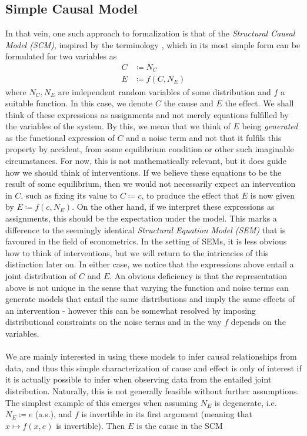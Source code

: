 \documentclass[11pt, a4paper]{memoir}
\theoremstyle{break}
\theoremstyle{break}
\theoremstyle{nonumberplain}
\begin{document}
\subsection{Simple Causal Model}
In that vein, one such approach to formalization is that of the \textit{Structural Causal Model (SCM)}, inspired by the terminology \cite{Peters}, which in its most simple form can be formulated for two variables as
\begin{align*}
C&\coloneqq N_C\\
E&\coloneqq f(C,N_E)
\end{align*}
where $N_C,N_E$ are independent random variables of some distribution and $f$ a suitable function. In this case, we denote $C$ the cause and $E$ the effect. We shall think of these expressions as assignments and not merely equations fulfilled by the variables of the system. By this, we mean that we think of $E$ being \textit{generated} as the functional expression of $C$ and a noise term and not that it fulfils this property by accident, from some equilibrium condition or other such imaginable circumstances. For now, this is not mathematically relevant, but it does guide how we should think of interventions. If we believe these equations to be the result of some equilibrium, then we would not necessarily expect an intervention in $C$, such as fixing its value to $C\coloneqq c$, to produce the effect that $E$ is now given by $E\coloneqq f(c,N_E)$. On the other hand, if we interpret these expressions as assignments, this should be the expectation under the model. This marks a difference to the seemingly identical \textit{Structural Equation Model (SEM)} that is favoured in the field of econometrics. In the setting of SEMs, it is less obvious how to think of interventions, but we will return to the intricacies of this distinction later on. In either case, we notice that the expressions above entail a joint distribution of $C$ and $E$. An obvious deficiency is that the representation above is not unique in the sense that varying the function and noise terms can generate models that entail the same distributions and imply the same effects of an intervention - however this can be somewhat resolved by imposing distributional constraints on the noise terms and in the way $f$ depends on the variables.\\\\ 
We are mainly interested in using these models to infer causal relationships from data, and thus this simple characterization of cause and effect is only of interest if it is actually possible to infer when observing data from the entailed joint distribution. Naturally, this is not generally feasible without further assumptions. The simplest example of this emerges when assuming $N_E$ is degenerate, i.e. $N_E\coloneqq e$ (a.s.), and $f$ is invertible in its first argument (meaning that $x\mapsto f(x,e)$ is invertible). Then $E$ is the cause in the SCM
\end{document}
